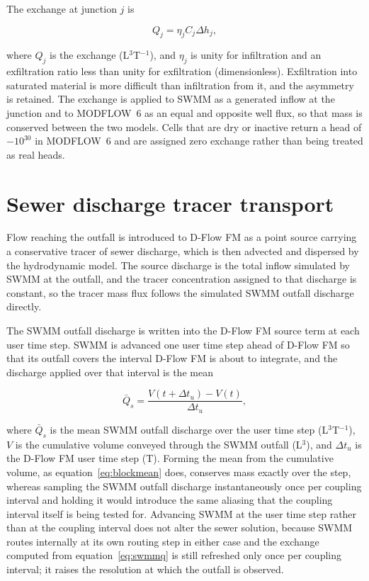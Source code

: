 \documentclass[preprint,authoryear,11pt]{elsarticle}
\begin{document}
The exchange at junction $j$ is

\begin{equation}
  Q_{j} = \eta_{j} C_{j} \Delta h_{j} ,
  \label{eq:swmmq}
\end{equation}

\noindent where $Q_{j}$ is the exchange (L$^{3}$T$^{-1}$), and $\eta_{j}$ is unity for infiltration and an exfiltration ratio less than unity for exfiltration (dimensionless). Exfiltration into saturated material is more difficult than infiltration from it, and the asymmetry is retained. The exchange is applied to SWMM as a generated inflow at the junction and to MODFLOW~6 as an equal and opposite well flux, so that mass is conserved between the two models. Cells that are dry or inactive return a head of $-10^{30}$ in MODFLOW~6 and are assigned zero exchange rather than being treated as real heads.

\section{Sewer discharge tracer transport}

Flow reaching the outfall is introduced to D-Flow FM as a point source carrying a conservative tracer of sewer discharge, which is then advected and dispersed by the hydrodynamic model. The source discharge is the total inflow simulated by SWMM at the outfall, and the tracer concentration assigned to that discharge is constant, so the tracer mass flux follows the simulated SWMM outfall discharge directly.

The SWMM outfall discharge is written into the D-Flow FM source term at each user time step. SWMM is advanced one user time step ahead of D-Flow FM so that its outfall covers the interval D-Flow FM is about to integrate, and the discharge applied over that interval is the mean

\begin{equation}
  \bar{Q}_{s} = \frac{V\!\left(t + \Delta t_{u}\right) - V\!\left(t\right)}
                     {\Delta t_{u}} ,
  \label{eq:blockmean}
\end{equation}

\noindent where $\bar{Q}_{s}$ is the mean SWMM outfall discharge over the user time step (L$^{3}$T$^{-1}$), $V$ is the cumulative volume conveyed through the SWMM outfall (L$^{3}$), and $\Delta t_{u}$ is the D-Flow FM user time step (T). Forming the mean from the cumulative volume, as equation~\ref{eq:blockmean} does, conserves mass exactly over the step, whereas sampling the SWMM outfall discharge instantaneously once per coupling interval and holding it would introduce the same aliasing that the coupling interval itself is being tested for. Advancing SWMM at the user time step rather than at the coupling interval does not alter the sewer solution, because SWMM routes internally at its own routing step in either case and the exchange computed from equation~\ref{eq:swmmq} is still refreshed only once per coupling interval; it raises the resolution at which the outfall is observed.
\end{document}
